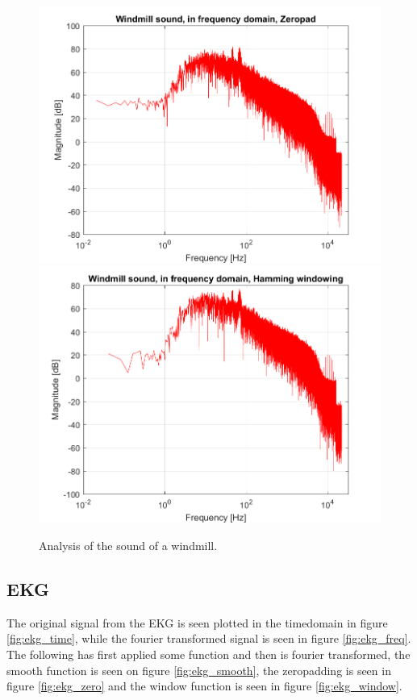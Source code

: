 \begin{figure}[htb!]
	{\includegraphics[width=0.45\linewidth]{code/Windmill_figure4.png}}
	{\includegraphics[width=0.45\linewidth]{code/Windmill_figure5.png}}
	\caption{Analysis of the sound of a windmill.}\label{fig:windmill}
\end{figure}


\subsection{EKG}

The original signal from the EKG is seen plotted in the timedomain in figure \ref{fig:ekg_time}, while the fourier transformed signal is seen in figure \ref{fig:ekg_freq}. The following has first applied some function and then is fourier transformed, the smooth function is seen on figure \ref{fig:ekg_smooth}, the zeropadding is seen in figure \ref{fig:ekg_zero} and the window function is seen in figure \ref{fig:ekg_window}.


